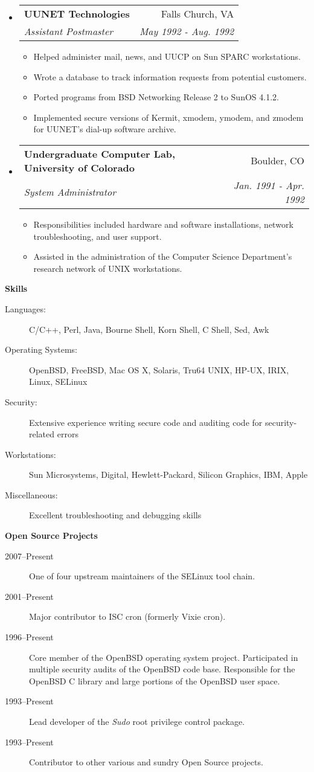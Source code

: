 \documentclass[a4paper,11pt]{article}
\makeatletter
\newcommand{\resitem}[1]{\item #1 \vspace{-2pt}}
\newcommand{\resheading}[1]{{\large \colorbox{mygrey}{\begin{minipage}{\textwidth}{\textbf{#1 \vphantom{p\^{E}}}}\end{minipage}}}}
\newcommand{\ressubheading}[4]{
\begin{tabular*}{172mm}{l@{\extracolsep{\fill}}r}
		\textbf{#1} & #2 \\
		\textit{#3} & \textit{#4} \\
\end{tabular*}\vspace{-6pt}}
\makeatother
\begin{document}
\begin{itemize}
\item
	\ressubheading{{\sc \bf UUNET} Technologies}{Falls Church, VA}{Assistant Postmaster}{May 1992 - Aug. 1992}
	\begin{itemize}
		\resitem{Helped administer mail, news, and {\sc UUCP} on Sun SPARC workstations.}
		\resitem{Wrote a database to track information requests from potential customers.}
		\resitem{Ported programs from BSD Networking Release 2 to SunOS 4.1.2.}
		\resitem{Implemented secure versions of Kermit, xmodem, ymodem, and zmodem for {\sc UUNET}'s dial-up software archive.}
	\end{itemize}

\item
	\ressubheading{Undergraduate Computer Lab, University of Colorado}{Boulder, CO}{System Administrator}{Jan. 1991 - Apr. 1992}
	\begin{itemize}
		\resitem{Responsibilities included hardware and software installations, network troubleshooting, and user support.}
		\resitem{Assisted in the administration of the Computer Science Department's research network of {\sc UNIX} workstations.}
	\end{itemize}

\end{itemize}

\pagebreak 

\resheading{Skills}

\begin{description}
\item[Languages:]
C/C++, Perl, Java, Bourne Shell, Korn Shell, C Shell, Sed, Awk
\item[Operating Systems:]
OpenBSD, FreeBSD, Mac OS X, Solaris, Tru64 {\sc UNIX}, {\sc HP-UX}, {\sc IRIX}, Linux, SELinux
\item[Security:]
Extensive experience writing secure code and auditing code for security-related errors
\item[Workstations:]
Sun Microsystems, Digital, Hewlett-Packard, Silicon Graphics, {\sc IBM}, Apple
\item[Miscellaneous:]
Excellent troubleshooting and debugging skills
\end{description}

\resheading{Open Source Projects}

\begin{description}
\item[2007--Present] One of four upstream maintainers of the SELinux tool chain.
\item[2001--Present] Major contributor to ISC cron (formerly Vixie cron).
\item[1996--Present] Core member of the OpenBSD operating system project.  Participated in multiple security audits of the OpenBSD code base.  Responsible for the OpenBSD C library and large portions of the OpenBSD user space.
\item[1993--Present] Lead developer of the \emph{Sudo} root privilege control package.
\item[1993--Present] Contributor to other various and sundry Open Source projects.
\end{description}
\end{document}
